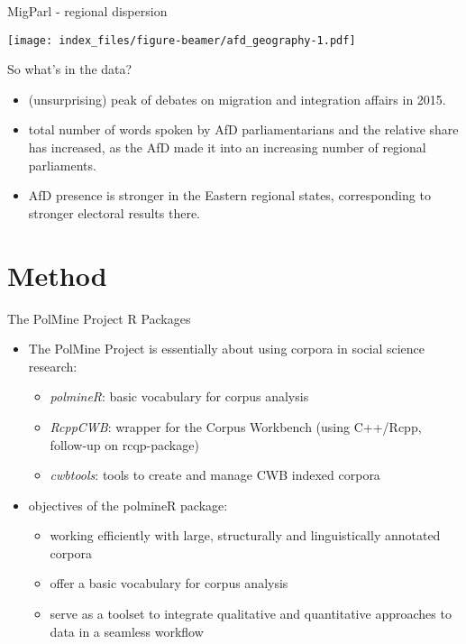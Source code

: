 \documentclass[
  ignorenonframetext,
]{beamer}
\providecommand{\tightlist}{%
  \setlength{\itemsep}{0pt}\setlength{\parskip}{0pt}}
\begin{document}
\begin{frame}{MigParl - regional dispersion}
\protect\hypertarget{migparl---regional-dispersion}{}

\texttt{[image: index\_files/figure-beamer/afd\_geography-1.pdf]}

\end{frame}

\begin{frame}{So what's in the data?}
\protect\hypertarget{so-whats-in-the-data}{}

\begin{itemize}
\item
  (unsurprising) peak of debates on migration and integration affairs in
  2015.
\item
  total number of words spoken by AfD parliamentarians and the relative
  share has increased, as the AfD made it into an increasing number of
  regional parliaments.
\item
  AfD presence is stronger in the Eastern regional states, corresponding
  to stronger electoral results there.
\end{itemize}

\end{frame}

\hypertarget{method}{%
\section{Method}\label{method}}

\begin{frame}{The PolMine Project R Packages}
\protect\hypertarget{the-polmine-project-r-packages}{}

\begin{itemize}
\tightlist
\item
  The PolMine Project is essentially about using corpora in social
  science research:

  \begin{itemize}
  \tightlist
  \item
    \emph{polmineR}: basic vocabulary for corpus analysis
  \item
    \emph{RcppCWB}: wrapper for the Corpus Workbench (using C++/Rcpp,
    follow-up on rcqp-package)
  \item
    \emph{cwbtools}: tools to create and manage CWB indexed corpora
  \end{itemize}
\item
  objectives of the polmineR package:

  \begin{itemize}
  \tightlist
  \item
    working efficiently with large, structurally and linguistically
    annotated corpora
  \item
    offer a basic vocabulary for corpus analysis
  \item
    serve as a toolset to integrate qualitative and quantitative
    approaches to data in a seamless workflow
  \end{itemize}
\end{itemize}

\end{frame}
\end{document}
